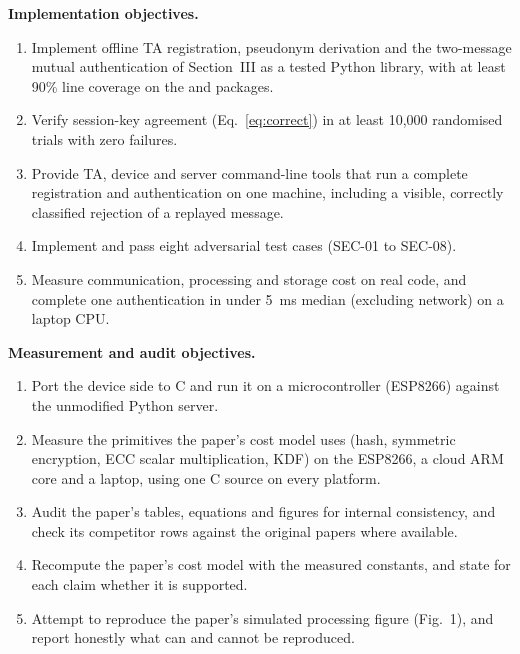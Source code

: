 \documentclass[12pt,a4paper,oneside]{report}
\numberwithin{equation}{chapter}
\begin{document}
\textbf{Implementation objectives.}
\begin{enumerate}[nosep]
  \item Implement offline TA registration, pseudonym derivation and the two-message mutual authentication of Section~III as a tested Python library, with at least 90\% line coverage on the  and  packages.
  \item Verify session-key agreement (Eq.~\ref{eq:correct}) in at least 10{,}000 randomised trials with zero failures.
  \item Provide TA, device and server command-line tools that run a complete registration and authentication on one machine, including a visible, correctly classified rejection of a replayed message.
  \item Implement and pass eight adversarial test cases (SEC-01 to SEC-08).
  \item Measure communication, processing and storage cost on real code, and complete one authentication in under 5~ms median (excluding network) on a laptop CPU.
\end{enumerate}

\textbf{Measurement and audit objectives.}
\begin{enumerate}
  \item Port the device side to C and run it on a microcontroller (ESP8266) against the unmodified Python server.
  \item Measure the primitives the paper's cost model uses (hash, symmetric encryption, ECC scalar multiplication, KDF) on the ESP8266, a cloud ARM core and a laptop, using one C source on every platform.
  \item Audit the paper's tables, equations and figures for internal consistency, and check its competitor rows against the original papers where available.
  \item Recompute the paper's cost model with the measured constants, and state for each claim whether it is supported.
  \item Attempt to reproduce the paper's simulated processing figure (Fig.~1), and report honestly what can and cannot be reproduced.
\end{enumerate}
\end{document}
